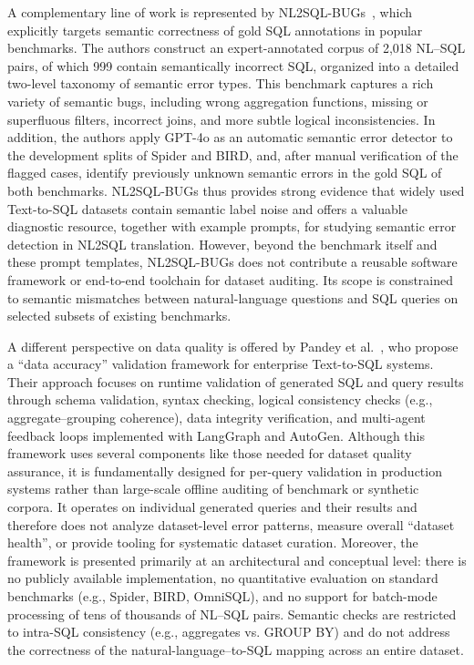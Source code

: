 \documentclass[]{einformatica}
\begin{document}
A complementary line of work is represented by NL2SQL-BUGs~\cite{liu2025nl2sqlbugs}, which explicitly targets semantic correctness of gold SQL annotations in popular benchmarks. The authors construct an expert-annotated corpus of 2,018 NL--SQL pairs, of which 999 contain semantically incorrect SQL, organized into a detailed two-level taxonomy of semantic error types. This benchmark captures a rich variety of semantic bugs, including wrong aggregation functions, missing or superfluous filters, incorrect joins, and more subtle logical inconsistencies. In addition, the authors apply GPT-4o as an automatic semantic error detector to the development splits of Spider and BIRD, and, after manual verification of the flagged cases, identify previously unknown semantic errors in the gold SQL of both benchmarks. NL2SQL-BUGs thus provides strong evidence that widely used Text-to-SQL datasets contain semantic label noise and offers a valuable diagnostic resource, together with example prompts, for studying semantic error detection in NL2SQL translation. However, beyond the benchmark itself and these prompt templates, NL2SQL-BUGs does not contribute a reusable software framework or end-to-end toolchain for dataset auditing. Its scope is constrained to semantic mismatches between natural-language questions and SQL queries on selected subsets of existing benchmarks.

A different perspective on data quality is offered by Pandey et al.~\cite{pandey2024validation}, who propose a ``data accuracy'' validation framework for enterprise Text-to-SQL systems. Their approach focuses on runtime validation of generated SQL and query results through schema validation, syntax checking, logical consistency checks (e.g., aggregate--grouping coherence), data integrity verification, and multi-agent feedback loops implemented with LangGraph and AutoGen. Although this framework uses several components like those needed for dataset quality assurance, it is fundamentally designed for per-query validation in production systems rather than large-scale offline auditing of benchmark or synthetic corpora. It operates on individual generated queries and their results and therefore does not analyze dataset-level error patterns, measure overall ``dataset health'', or provide tooling for systematic dataset curation. Moreover, the framework is presented primarily at an architectural and conceptual level: there is no publicly available implementation, no quantitative evaluation on standard benchmarks (e.g., Spider, BIRD, OmniSQL), and no support for batch-mode processing of tens of thousands of NL--SQL pairs. Semantic checks are restricted to intra-SQL consistency (e.g., aggregates vs. GROUP BY) and do not address the correctness of the natural-language--to-SQL mapping across an entire dataset.
\end{document}
